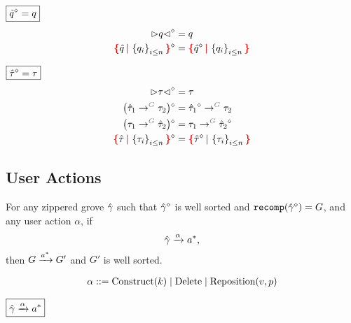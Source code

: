 \noindent $\boxed{\erase{\Z{q}} = q}$
%
\begin{align*}
  \erase{\cursor{q}} &= q \\
  \erase{\conflictHole{\Z{q}, \SetOf{q_i}_{i \leq n}}} &= \conflictHole{\erase{\Z{q}}, \SetOf{q_i}_{i \leq n}}
\end{align*}

\noindent $\boxed{\erase{\Z{\tau}} = \tau}$
%
\begin{align*}
  \erase{\cursor{\tau}} &= \tau \\
  \erase{\left(\tArrow{G}{\Z{\tau}_1}{\tau_2}\right)} &= \tArrow{G}{\erase{\Z{\tau}_1}}{\tau_2} \\
  \erase{\left(\tArrow{G}{\tau_1}{\Z{\tau}_2}\right)} &= \tArrow{G}{\tau_1}{\erase{\Z{\tau}_2}} \\
  \erase{\conflictHole{\Z{\tau}, \SetOf{\tau_i}_{i \leq n}}} &= \conflictHole{\erase{\Z{\tau}}, \SetOf{\tau_i}_{i \leq n}}
\end{align*}


\subsection{User Actions}

\begin{theorem}[Sensibility]
  For any zippered grove $\Z{\Grove}$
  such that $\erase{\Z{\Grove}}$ is well sorted
    and $\recomp{\erase{\Z{\Grove}}} = G$,
  and any user action $\alpha$,
  if
  \[
    \applyAction{\Z{\Grove}}{\alpha}{a^{*}},
  \]
  then $G \action{a^{*}} G'$ and $G'$ is well sorted.
\end{theorem}

\[
  \arraycolsep=0pt
  \begin{array}{llll}
    \alpha & {}::={} &
      \Construct{k}
      \mid \Delete
      \mid \Reposition{v}{p}
    \\
  \end{array}
\]

\noindent $\boxed{\Z{\Grove} \action{\alpha} a^{*}}$
%
\begin{mathpar}


\end{mathpar}


